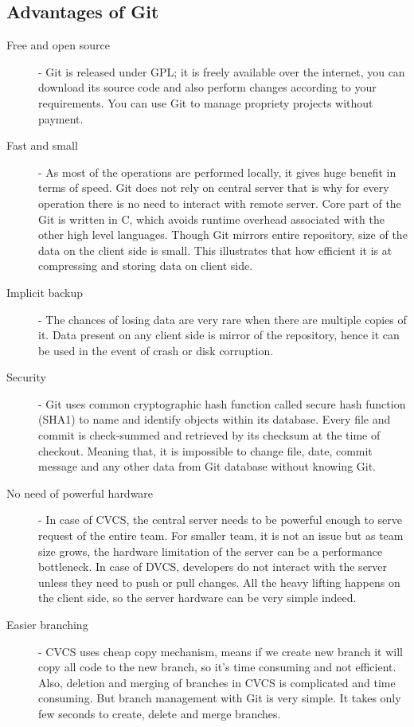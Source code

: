 \documentclass{book}
\begin{document}
    \subsection*{Advantages of Git}
    \begin{description}
        \item [Free and open source] - Git is released under GPL; it is freely available over the internet, you can download its source code and also perform changes according to your requirements. You can use Git to manage propriety projects without payment.
        \item [Fast and small] - As most of the operations are performed locally, it gives huge benefit in terms of speed. Git does not rely on central server that is why for every operation there is no need to interact with remote server. Core part of the Git is written in C, which avoids runtime overhead associated with the other high level languages. Though Git mirrors entire repository, size of the data on the client side is small. This illustrates that how efficient it is at compressing and storing data on client side.
        \item [Implicit backup] - The chances of losing data are very rare when there are multiple copies of it. Data present on any client side is mirror of the repository, hence it can be used in the event of crash or disk
corruption.

        \item [Security] - Git uses common cryptographic hash function called secure hash function (SHA1) to name and identify objects within its database. Every file and commit is check-summed and retrieved by its checksum at the time of checkout. Meaning that, it is impossible to change
file, date, commit message and any other data from Git database without knowing Git.
        \item [No need of powerful hardware] - In case of CVCS, the central server needs to be powerful enough to serve request of the entire team. For smaller team, it is not an issue but as team size grows, the hardware limitation of the server can be a performance bottleneck. In case of DVCS, developers do not interact with the server unless they need to push or pull changes. All the heavy lifting happens on the client side, so the server hardware can be very simple indeed.

        \item [Easier branching] - CVCS uses cheap copy mechanism, means if we create new branch it will copy all code to the new branch, so it’s time consuming and not efficient. Also, deletion and merging of branches in CVCS is complicated and time consuming. But branch management with Git is very simple. It takes only few seconds to create, delete and merge branches.
    \end{description}
\end{document}
